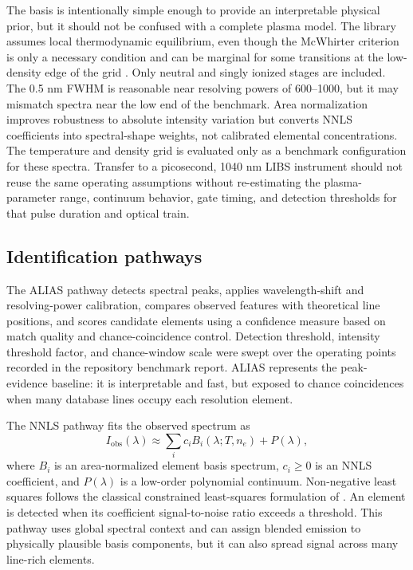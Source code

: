 \documentclass[preprint,12pt,authoryear]{elsarticle}
\begin{document}
The basis is intentionally simple enough to provide an interpretable physical prior, but it should not be confused with a complete plasma model. The library assumes local thermodynamic equilibrium, even though the McWhirter criterion is only a necessary condition and can be marginal for some transitions at the low-density edge of the grid \citep{Cristoforetti2010}. Only neutral and singly ionized stages are included. The 0.5 nm FWHM is reasonable near resolving powers of 600--1000, but it may mismatch spectra near the low end of the benchmark. Area normalization improves robustness to absolute intensity variation but converts NNLS coefficients into spectral-shape weights, not calibrated elemental concentrations. The temperature and density grid is evaluated only as a benchmark configuration for these spectra. Transfer to a picosecond, 1040 nm LIBS instrument should not reuse the same operating assumptions without re-estimating the plasma-parameter range, continuum behavior, gate timing, and detection thresholds for that pulse duration and optical train.

\subsection{Identification pathways}

The ALIAS pathway detects spectral peaks, applies wavelength-shift and resolving-power calibration, compares observed features with theoretical line positions, and scores candidate elements using a confidence measure based on match quality and chance-coincidence control. Detection threshold, intensity threshold factor, and chance-window scale were swept over the operating points recorded in the repository benchmark report. ALIAS represents the peak-evidence baseline: it is interpretable and fast, but exposed to chance coincidences when many database lines occupy each resolution element.

The NNLS pathway fits the observed spectrum as
\begin{equation}
I_{\mathrm{obs}}(\lambda) \approx \sum_i c_i B_i(\lambda;T,n_e) + P(\lambda),
\end{equation}
where $B_i$ is an area-normalized element basis spectrum, $c_i\ge 0$ is an NNLS coefficient, and $P(\lambda)$ is a low-order polynomial continuum. Non-negative least squares follows the classical constrained least-squares formulation of \citet{LawsonHanson1974}. An element is detected when its coefficient signal-to-noise ratio exceeds a threshold. This pathway uses global spectral context and can assign blended emission to physically plausible basis components, but it can also spread signal across many line-rich elements.
\end{document}
